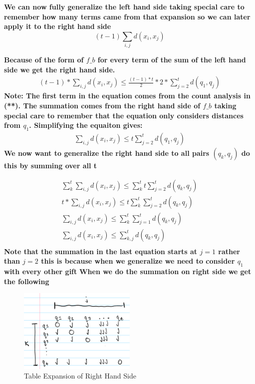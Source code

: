 \documentclass[addpoints]{exam}
\begin{document}
\begin{questions}
\begin{parts}
\textbf{We can now fully generalize the left hand side taking special care to remember how many terms came from that expansion so we can later apply it to the right hand side}
\[
(t-1) \sum_{i,j} d(x_i, x_j)
\]

\textbf{Because of the form of $f\_b$ for every term of the sum of the left hand side we get the right hand side.}
\begin{align*}
    (t-1) * \sum_{i,j}d(x_i, x_j) \le \frac{(t-1) * t}{2} * 2 * \sum_{j=2}^{t} d(q_1,q_j)
\end{align*}
\textbf{Note: The first term in the equation comes from the count analysis in (**). The summation comes from the right hand side of $f\_b$ taking special care to remember that the equation only considers distances from $q_1$. Simplifying the equaiton gives:}
\begin{align*}
    \sum_{i,j}d(x_i, x_j) \le t \sum_{j=2}^{t} d(q_1,q_j)
\end{align*}
\textbf{We now want to generalize the right hand side to all pairs $(q_k,q_j)$ do this by summing over all t}

\begin{align*}
    \sum_k^t \sum_{i,j}d(x_i, x_j) \le \sum_k^t t \sum_{j=2}^{t} d(q_k,q_j) \\
    t * \sum_{i,j} d(x_i, x_j) \le t \sum_k^t \sum_{j=2}^{t} d(q_k,q_j) \\
    \sum_{i,j} d(x_i, x_j) \le \sum_k^t \sum_{j=1}^{t} d(q_k,q_j) \\
    \sum_{i,j} d(x_i, x_j) \le \sum_{k,j}^{t} d(q_k,q_j) \\
\end{align*}
\textbf{Note that the summation in the last equation starts at $j=1$ rather than $j=2$ this is because when we generalize we need to consider $q_1$ with every other gift}
\textbf{When we do the summation on right side we get the following}
 \begin{figure}[H]
 \centering
  \includegraphics[width=0.5\textwidth]{RHS expansion.png}
 \caption{Table Expansion of Right Hand Side}
 \end{figure}


\end{parts}
\end{questions}
\end{document}
